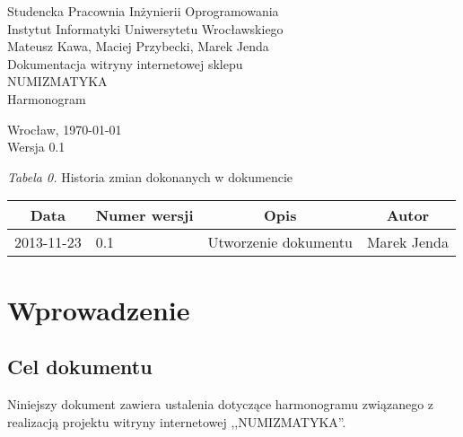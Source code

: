 \documentclass [11pt, a4paper, leqno]	{article}	%
\begin{document}

\begin{center}
	\thispagestyle{empty} 							%
	{\large Studencka Pracownia Inżynierii Oprogramowania} 		\\ [0.5cm]
	{\large Instytut Informatyki Uniwersytetu Wrocławskiego} 	\\ [6.0cm]

	{\large Mateusz Kawa, Maciej Przybecki, Marek Jenda} 		\\ [1.5cm]

	{\huge Dokumentacja witryny internetowej sklepu} 			\\ [0.5cm]
	{\huge NUMIZMATYKA} 										\\ [1.5cm]

	{\large Harmonogram} 										\\ [0.5cm]

	\vfill
	
	{\large Wrocław, \today}									\\ [0.5cm]
	{\large Wersja 0.1}
\end{center}

\newpage


\textit{Tabela 0.} Historia zmian dokonanych w dokumencie

\begin{center}
	\begin{tabular}{| l | l | l | l |}
		\hline
		\multicolumn{1}{|c|}{Data} & 
		\multicolumn{1}{|c|}{Numer wersji} &  
		\multicolumn{1}{|c|}{Opis} &
		\multicolumn{1}{|c|}{Autor} \\ \hline \hline
		2013-11-23 & 0.1 & Utworzenie dokumentu & Marek Jenda \\ \hline
	\end{tabular}
\end{center}

\newpage


\tableofcontents

\newpage

\section{Wprowadzenie}

\subsection{Cel dokumentu}
\noindent
Niniejszy dokument zawiera ustalenia dotyczące harmonogramu związanego z realizacją projektu witryny internetowej ,,NUMIZMATYKA''.
\end{document}
